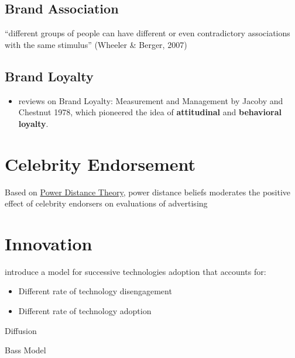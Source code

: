 \documentclass[
]{book}
\providecommand{\tightlist}{%
  \setlength{\itemsep}{0pt}\setlength{\parskip}{0pt}}
\begin{document}
\hypertarget{brand-association}{%
\section{Brand Association}\label{brand-association}}

``different groups of people can have different or even contradictory associations with the same stimulus'' (Wheeler \& Berger, 2007)

\hypertarget{brand-loyalty}{%
\section{Brand Loyalty}\label{brand-loyalty}}

\begin{itemize}
\tightlist
\item
  \citep{berkowitz1978, berkowitz1978a} reviews on Brand Loyalty: Measurement and Management by Jacoby and Chestnut 1978, which pioneered the idea of \textbf{attitudinal} and \textbf{behavioral loyalty}.
\end{itemize}

\hypertarget{celebrity-endorsement}{%
\chapter{Celebrity Endorsement}\label{celebrity-endorsement}}

Based on \href{https://bookdown.org/mike/social-theory/power-distance-theory.html}{Power Distance Theory}, power distance beliefs moderates the positive effect of celebrity endorsers on evaluations of advertising \citep{Winterich_2018}

\hypertarget{innovation}{%
\chapter{Innovation}\label{innovation}}

\citep{Chandrasekaran_2020} introduce a model for successive technologies adoption that accounts for:

\begin{itemize}
\tightlist
\item
  Different rate of technology disengagement
\item
  Different rate of technology adoption
\end{itemize}

Diffusion

Bass Model \citep{Bass_1969}
\end{document}
